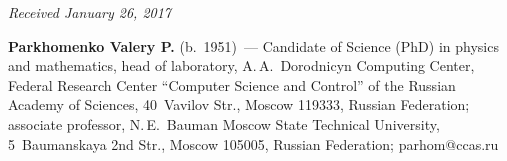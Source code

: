 \vspace*{-3pt}

\hfill{\small\textit{Received January 26, 2017}}
  
  \Contrl
  
  \noindent
\textbf{Parkhomenko Valery P.} (b.\ 1951)~--- Candidate of Science (PhD) in physics and mathematics, 
head of laboratory, A.\,A.~Dorodnicyn Computing Center, Federal Research Center ``Computer Science and 
Control'' of the Russian Academy of Sciences, 40~Vavilov Str., Moscow 119333, Russian Federation; 
associate professor, N.\,E.~Bauman Moscow State Technical University, 5~Baumanskaya 
2nd Str., Moscow 
105005, Russian Federation; \mbox{parhom@ccas.ru}
  
\label{end\stat}


\renewcommand{\bibname}{\protect\rm Литература} 